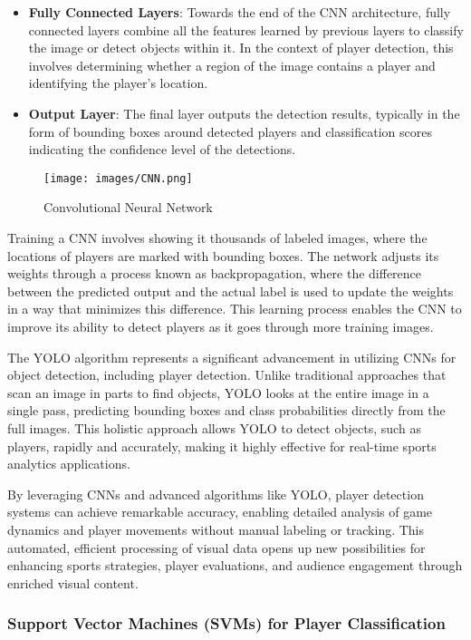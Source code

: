 \documentclass[12pt, letterpaper]{article}
\begin{document}
{\begin{spacing}{1.2}
\begin{itemize}
    \item \textbf{Fully Connected Layers}: Towards the end of the CNN architecture, fully connected layers combine all the features learned by previous layers to classify the image or detect objects within it. In the context of player detection, this involves determining whether a region of the image contains a player and identifying the player's location.

    \item \textbf{Output Layer}: The final layer outputs the detection results, typically in the form of bounding boxes around detected players and classification scores indicating the confidence level of the detections.
\end{itemize}

\begin{figure}[htbp]
\centering
\texttt{[image: images/CNN.png]}
\captionsetup{font=large}
\caption{Convolutional Neural Network}
\label{fig:cnn}
\end{figure}

Training a CNN involves showing it thousands of labeled images, where the locations of players are marked with bounding boxes. The network adjusts its weights through a process known as backpropagation, where the difference between the predicted output and the actual label is used to update the weights in a way that minimizes this difference. This learning process enables the CNN to improve its ability to detect players as it goes through more training images.

The YOLO algorithm represents a significant advancement in utilizing CNNs for object detection, including player detection. Unlike traditional approaches that scan an image in parts to find objects, YOLO looks at the entire image in a single pass, predicting bounding boxes and class probabilities directly from the full images. This holistic approach allows YOLO to detect objects, such as players, rapidly and accurately, making it highly effective for real-time sports analytics applications.

By leveraging CNNs and advanced algorithms like YOLO, player detection systems can achieve remarkable accuracy, enabling detailed analysis of game dynamics and player movements without manual labeling or tracking. This automated, efficient processing of visual data opens up new possibilities for enhancing sports strategies, player evaluations, and audience engagement through enriched visual content.

\subsubsection{Support Vector Machines (SVMs) for Player Classification}


\end{spacing}}
\end{document}
